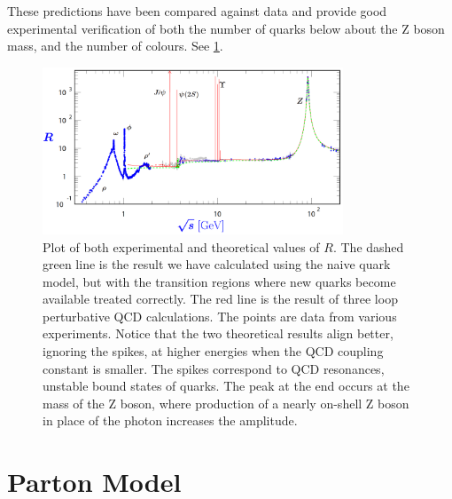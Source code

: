 \documentclass[fleqn]{NotesClass}
\newcommand{\Pparticle}[1]{\mathrm{#1}}
\newcommand{\PZ}{\ensuremath{\Pparticle{Z}}}
\begin{document}
    These predictions have been compared against data and provide good experimental verification of both the number of quarks below about the \PZ{} boson mass, and the number of colours.
    See \cref{fig:electron positron to hadron vs muon}.
    
    \begin{figure}
        \includegraphics[width=0.8\textwidth]{images/hadron-muon-branching-ratio}
        \caption{Plot of both experimental and theoretical values of \(R\). The dashed green line is the result we have calculated using the naive quark model, but with the transition regions where new quarks become available treated correctly. The red line is the result of three loop perturbative QCD calculations. The points are data from various experiments. Notice that the two theoretical results align better, ignoring the spikes, at higher energies when the QCD coupling constant is smaller. The spikes correspond to QCD resonances, unstable bound states of quarks. The peak at the end occurs at the mass of the \PZ{} boson, where production of a nearly on-shell \PZ{} boson in place of the photon increases the amplitude.}
        \label{fig:electron positron to hadron vs muon}
    \end{figure}
    
    \chapter{Parton Model}
\end{document}
